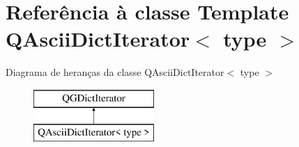 \hypertarget{class_q_ascii_dict_iterator}{\section{Referência à classe Template Q\-Ascii\-Dict\-Iterator$<$ type $>$}
\label{class_q_ascii_dict_iterator}
}
Diagrama de heranças da classe Q\-Ascii\-Dict\-Iterator$<$ type $>$\begin{figure}[H]
\begin{center}
\leavevmode
\includegraphics[height=2.000000cm]{class_q_ascii_dict_iterator}
\end{center}
\end{figure}
